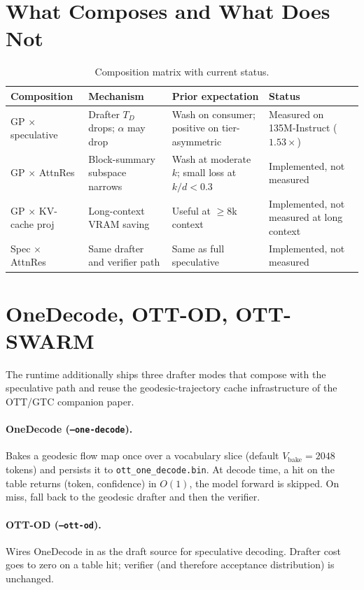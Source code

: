 \documentclass[11pt]{article}
\begin{document}
\section{What Composes and What Does Not}
\label{sec:compose}
\begin{table}[h]\centering\small
\caption{Composition matrix with current status.}
\begin{tabularx}{\textwidth}{@{}lXXl@{}}
\toprule
Composition & Mechanism & Prior expectation & Status \\
\midrule
GP $\times$ speculative   & Drafter $T_D$ drops; $\alpha$ may drop & Wash on consumer; positive on tier-asymmetric & Measured on 135M-Instruct ($1.53\times$) \\
GP $\times$ AttnRes       & Block-summary subspace narrows & Wash at moderate $k$; small loss at $k/d{<}0.3$ & Implemented, not measured \\
GP $\times$ KV-cache proj & Long-context VRAM saving & Useful at $\geq 8$k context & Implemented, not measured at long context \\
Spec $\times$ AttnRes     & Same drafter and verifier path & Same as full speculative & Implemented, not measured \\
\bottomrule
\end{tabularx}
\end{table}

\section{OneDecode, OTT-OD, OTT-SWARM}
\label{sec:ottmodes}
The runtime additionally ships three drafter modes that compose with the
speculative path and reuse the geodesic-trajectory cache infrastructure
of the OTT/GTC companion paper.

\paragraph{OneDecode (\texttt{--one-decode}).}  Bakes a geodesic flow
map once over a vocabulary slice (default $V_\text{bake}{=}2048$
tokens) and persists it to \texttt{ott\_one\_decode.bin}.  At decode
time, a hit on the table returns (token, confidence) in $O(1)$, the
model forward is skipped.  On miss, fall back to the geodesic drafter
and then the verifier.

\paragraph{OTT-OD (\texttt{--ott-od}).}  Wires OneDecode in as the
draft source for speculative decoding.  Drafter cost goes to zero
on a table hit; verifier (and therefore acceptance distribution) is
unchanged.
\end{document}
